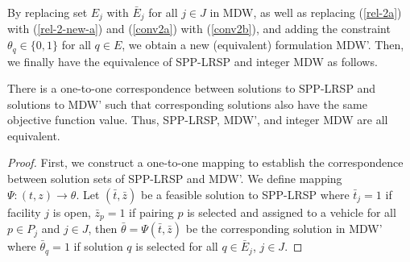 By replacing set $E_j$ with $\bar{E}_j$
for all $j \in J$ in MDW, as well as replacing (\ref{rel-2a}) with
(\ref{rel-2-new-a}) and (\ref{conv2a}) with (\ref{conv2b}),
and adding the constraint $\theta_q \in \{0, 1\}$ for
all $q \in E$, we obtain a new (equivalent) formulation MDW'. Then,
we finally have the equivalence of SPP-LRSP and integer MDW as follows.
\begin{prop}
\label{dw-prop-p2}
There is a one-to-one correspondence between solutions to SPP-LRSP
and solutions to MDW' such that corresponding solutions also have the
same objective function value. Thus, SPP-LRSP, MDW', and integer MDW 
are all equivalent.
\end{prop}
\begin{proof}
  First, we construct a one-to-one  mapping to establish the 
  correspondence between solution sets of SPP-LRSP and MDW'.
  We define mapping $\Psi:(t, z) \rightarrow \theta$.
  Let $(\bar{t}, \bar{z})$ be a feasible solution to SPP-LRSP
  where $\bar{t}_j = 1$ if facility $j$ is open, $\bar{z}_p = 1$ 
  if pairing $p$ is selected and assigned to a vehicle 
  for all $p \in P_j$ and $j \in J$, 
  then $\bar{\theta}=\Psi(\bar{t}, \bar{z})$ be the corresponding
  solution in MDW' where $\bar{\theta}_q = 1$ if 
  solution $q$  is selected for all $q \in \bar{E}_j$, $j \in J$.
  

\end{proof}
